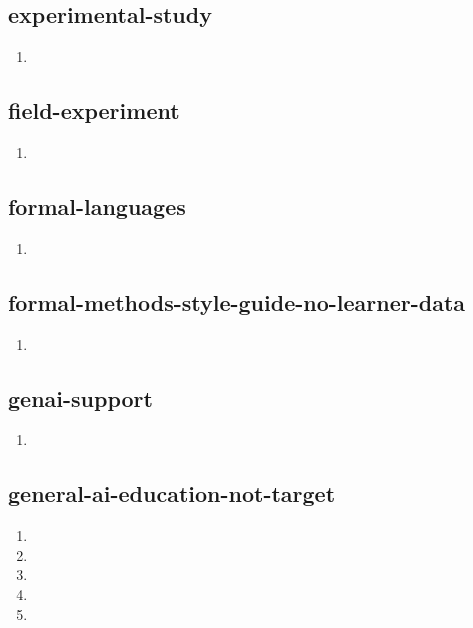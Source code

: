 \documentclass{article}
\begin{document}
\subsection{experimental-study}
\begin{enumerate}
\item {}
\end{enumerate}

\subsection{field-experiment}
\begin{enumerate}
\item {}
\end{enumerate}

\subsection{formal-languages}
\begin{enumerate}
\item {}
\end{enumerate}

\subsection{formal-methods-style-guide-no-learner-data}
\begin{enumerate}
\item {}
\end{enumerate}

\subsection{genai-support}
\begin{enumerate}
\item {}
\end{enumerate}

\subsection{general-ai-education-not-target}
\begin{enumerate}
\item {}
\item {}
\item {}
\item {}
\item {}
\end{enumerate}
\end{document}
